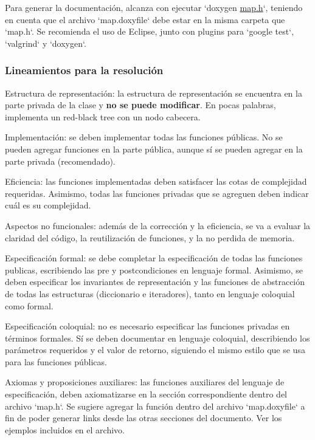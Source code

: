 \-Para generar la documentación, alcanza con ejecutar `doxygen \hyperlink{map_8h}{map.\-h}`, teniendo en cuenta que el archivo `map.doxyfile` debe estar en la misma carpeta que `map.h`. \-Se recomienda el uso de \-Eclipse, junto con plugins para `google test`, `valgrind` y `doxygen`.\hypertarget{Enunciado_enun-lineamiento}{}\subsubsection{\-Lineamientos para la resolución}\label{Enunciado_enun-lineamiento}

\begin{DoxyItemize}
\item \-Estructura de representación\-: la estructura de representación se encuentra en la parte privada de la clase y {\bfseries no se puede modificar}. \-En pocas palabras, implementa un red-\/black tree con un nodo cabecera.
\item \-Implementación\-: se deben implementar todas las funciones públicas. \-No se pueden agregar funciones en la parte pública, aunque sí se pueden agregar en la parte privada (recomendado).
\item \-Eficiencia\-: las funciones implementadas deben satisfacer las cotas de complejidad requeridas. \-Asimismo, todas las funciones privadas que se agreguen deben indicar cuál es su complejidad.
\item \-Aspectos no funcionales\-: además de la corrección y la eficiencia, se va a evaluar la claridad del código, la reutilización de funciones, y la no perdida de memoria.
\item \-Especificación formal\-: se debe completar la especificación de todas las funciones publicas, escribiendo las pre y postcondiciones en lenguaje formal. \-Asimismo, se deben especificar los invariantes de representación y las funciones de abstracción de todas las estructuras (diccionario e iteradores), tanto en lenguaje coloquial como formal.
\item \-Especificación coloquial\-: no es necesario especificar las funciones privadas en términos formales. \-Sí se deben documentar en lenguaje coloquial, describiendo los parámetros requeridos y el valor de retorno, siguiendo el mismo estilo que se usa para las funciones públicas.
\item \-Axiomas y proposiciones auxiliares\-: las funciones auxiliares del lenguaje de especificación, deben axiomatizarse en la sección correspondiente dentro del archivo `map.h`. \-Se sugiere agregar la función dentro del archivo `map.doxyfile` a fin de poder generar links desde las otras secciones del documento. \-Ver los ejemplos incluidos en el archivo.

\end{DoxyItemize}
